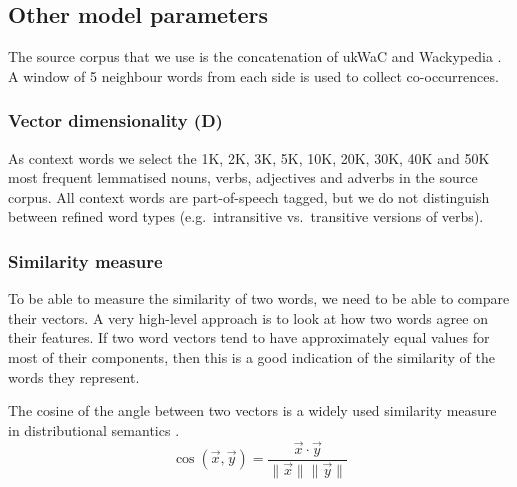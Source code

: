 \subsection{Other model parameters}
\label{sec:other-model-paramt}



The source corpus that we use is the concatenation of ukWaC and Wackypedia \cite{ukwac}.\footnotemark{} A window of 5 neighbour words from each side is used to collect co-occurrences.
%
%


\subsubsection{Vector dimensionality (D)}
\label{sec:vect-dimens}

As context words we select the 1K, 2K, 3K, 5K, 10K, 20K, 30K, 40K and 50K most frequent lemmatised nouns, verbs, adjectives and adverbs in the source corpus. All context words are part-of-speech tagged, but we do not distinguish between refined word types (e.g.~intransitive vs.~transitive versions of verbs).

\subsubsection{Similarity measure}
\label{sec:similarity-measure}

To be able to measure the similarity of two words, we need to be able to compare their vectors.\footnotemark{} A very high-level approach is to look at how two words agree on their features. If two word vectors tend to have approximately equal values for most of their components, then this is a good indication of the similarity of the words they represent.


The cosine of the angle between two vectors is a widely used similarity measure in distributional semantics \cite{Turney:2010:FMV:1861751.1861756,lapesa2014large}.
%
\begin{equation*}
  \label{eq:cos}
  \cos(\vec{x}, \vec{y}) = \frac{\vec{x} \cdot \vec{y}}
                                {\|\vec{x}\| \|\vec{y}\|}
\end{equation*}

